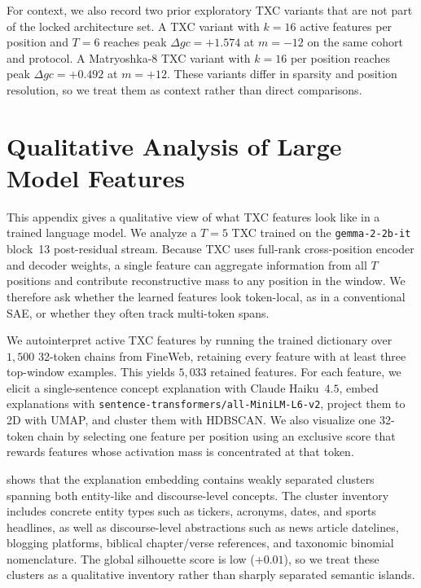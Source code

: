 For context, we also record two prior exploratory TXC variants that are not part of the locked architecture set. A TXC variant with $k=16$ active features per position and $T=6$ reaches peak $\Delta gc=+1.574$ at $m=-12$ on the same cohort and protocol. A Matryoshka-8 TXC variant with $k=16$ per position reaches peak $\Delta gc=+0.492$ at $m=+12$. These variants differ in sparsity and position resolution, so we treat them as context rather than direct comparisons.

\section{Qualitative Analysis of Large Model Features}
\label{app:meta-autointerp}

This appendix gives a qualitative view of what TXC features look like in a trained language model. We analyze a $T=5$ TXC trained on the \texttt{gemma-2-2b-it} block~13 post-residual stream. Because TXC uses full-rank cross-position encoder and decoder weights, a single feature can aggregate information from all $T$ positions and contribute reconstructive mass to any position in the window. We therefore ask whether the learned features look token-local, as in a conventional SAE, or whether they often track multi-token spans.

We autointerpret active TXC features by running the trained dictionary over $1{,}500$ 32-token chains from FineWeb, retaining every feature with at least three top-window examples. This yields $5{,}033$ retained features. For each feature, we elicit a single-sentence concept explanation with Claude Haiku~$4.5$, embed explanations with \texttt{sentence-transformers/all-MiniLM-L6-v2}, project them to 2D with UMAP, and cluster them with HDBSCAN. We also visualize one 32-token chain by selecting one feature per position using an exclusive score that rewards features whose activation mass is concentrated at that token.

 shows that the explanation embedding contains weakly separated clusters spanning both entity-like and discourse-level concepts. The cluster inventory includes concrete entity types such as tickers, acronyms, dates, and sports headlines, as well as discourse-level abstractions such as news article datelines, blogging platforms, biblical chapter/verse references, and taxonomic binomial nomenclature. The global silhouette score is low ($+0.01$), so we treat these clusters as a qualitative inventory rather than sharply separated semantic islands.

